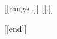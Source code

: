 \documentclass[a5paper,12pt,twoside,onecolumn,openright]{book}
\begin{document}
[[range .]]
[[.]]

[[end]]
\end{document}
